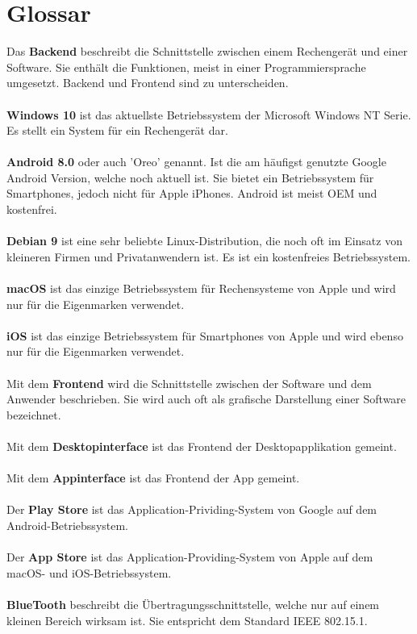 \section{Glossar}
Das \textbf{Backend} beschreibt die Schnittstelle zwischen einem Rechengerät und einer Software. Sie enthält die Funktionen, meist in einer Programmiersprache umgesetzt. Backend und Frontend sind zu unterscheiden.
\\
\\
\textbf{Windows 10} ist das aktuellste Betriebssystem der Microsoft Windows NT Serie. Es stellt ein System für ein Rechengerät dar.
\\
\\
\textbf{Android 8.0} oder auch 'Oreo' genannt. Ist die am häufigst genutzte Google Android Version, welche noch aktuell ist. Sie bietet ein Betriebssystem für Smartphones, jedoch nicht für Apple iPhones. Android ist meist OEM und kostenfrei.
\\
\\
\textbf{Debian 9} ist eine sehr beliebte Linux-Distribution, die noch oft im Einsatz von kleineren Firmen und Privatanwendern ist. Es ist ein kostenfreies Betriebssystem.
\\
\\
\textbf{macOS} ist das einzige Betriebssystem für Rechensysteme von Apple und wird nur für die Eigenmarken verwendet.
\\
\\
\textbf{iOS} ist das einzige Betriebssystem für Smartphones von Apple und wird ebenso nur für die Eigenmarken verwendet.
\\
\\
Mit dem \textbf{Frontend} wird die Schnittstelle zwischen der Software und dem Anwender beschrieben. Sie wird auch oft als grafische Darstellung einer Software bezeichnet.
\\
\\
Mit dem \textbf{Desktopinterface} ist das Frontend der Desktopapplikation gemeint.
\\
\\
Mit dem \textbf{Appinterface} ist das Frontend der App gemeint.
\\
\\
Der \textbf{Play Store} ist das Application-Prividing-System von Google auf dem Android-Betriebssystem.
\\
\\
Der \textbf{App Store} ist das Application-Providing-System von Apple auf dem macOS- und iOS-Betriebssystem.
\\
\\
\textbf{BlueTooth} beschreibt die Übertragungsschnittstelle, welche nur auf einem kleinen Bereich wirksam ist. Sie entspricht dem Standard IEEE 802.15.1.